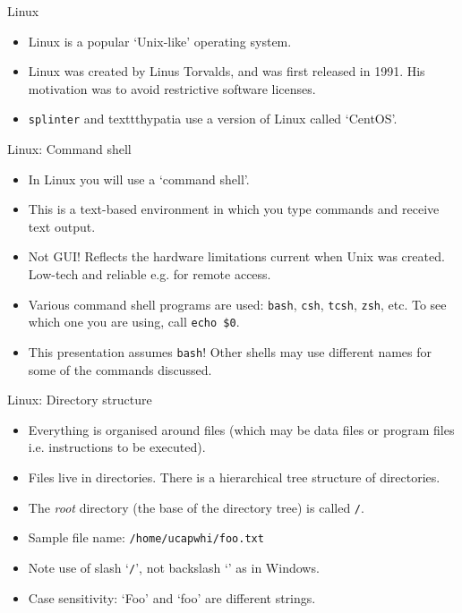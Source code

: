 \documentclass{beamer}
\newcommand{\command}[1]{\colorbox{light-gray}{\texttt{#1}}}
\newcommand{\filename}[1]{\colorbox{light-green}{\texttt{#1}}}
\begin{document}
\begin{frame}{Linux}
  \begin{itemize}
    \item Linux is a popular `Unix-like' operating system.
    \item Linux was created by  Linus Torvalds, and was first released in 1991. His motivation was to avoid restrictive software licenses.
    \item \texttt{splinter} and texttt{hypatia} use a version of Linux called `CentOS'.
   \end{itemize}
\end{frame}


\begin{frame}{Linux: Command shell}
  \begin{itemize}
    \item In Linux you will use a `command shell'.
    \item This is a text-based environment in which you type commands and receive text output.
    \item Not GUI! Reflects the hardware limitations current when Unix was created. Low-tech and reliable e.g. for remote access.
    \item Various command shell programs are used: \command{bash}, \command{csh}, \command{tcsh}, \command{zsh}, etc. To see which one you are using, call \command{echo \$0}.
    \item This presentation assumes \command{bash}! Other shells may use different names for some of the commands discussed.
   \end{itemize}
\end{frame}


\begin{frame}{Linux: Directory structure}
  \begin{itemize}
    \item Everything is organised around files (which may be data files or program files i.e. instructions to be executed).
    \item Files live in directories. There is a hierarchical tree structure of directories.
    \item The \textit{root} directory (the base of the directory tree) is called \filename{/}.
    \item Sample file name: \filename{/home/ucapwhi/foo.txt}
    \item Note use of slash `\texttt{/}', not backslash `\texttt{}' as in Windows.
    \item Case sensitivity: `Foo' and `foo' are different strings.
  \end{itemize}
\end{frame}
\end{document}
